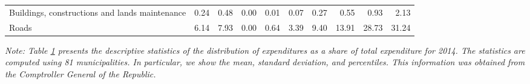 \begin{table}[h]
\begin{center}
{\begin{tabular}{lrrrrrrrrr}
Buildings, constructions and lands maintenance & 0.24 & 0.48 & 0.00 & 0.01 & 0.07 & 0.27 & 0.55 & 0.93 & 2.13 \\
Roads & 6.14 & 7.93 & 0.00 & 0.64 & 3.39 & 9.40 & 13.91 & 28.73 & 31.24 \\
\hline
\hline
\end{tabular}}
\label{table:sharessumm2014}
\end{center}
\footnotesize
\textit{Note: Table \ref{table:sharessumm2014} presents the descriptive statistics of the distribution of expenditures as a share of total expenditure for 2014. The statistics are computed using 81 municipalities. In particular, we show the mean, standard deviation, and percentiles. This information was obtained from the Comptroller General of the Republic.}
\end{table}

